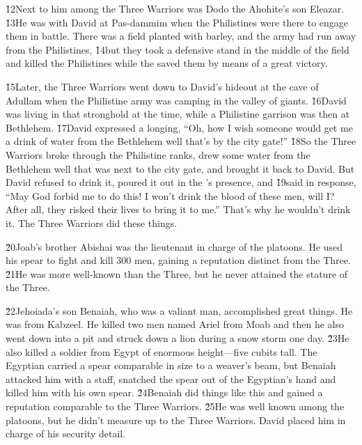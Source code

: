 \v{12}Next to him among the Three Warriors was Dodo the Ahohite's son Eleazar. \v{13}He was with David at Pas-dammim when the Philistines were there to engage them in battle. There was a field planted with barley, and the army had run away from the Philistines, \v{14}but they took a defensive stand in the middle of the field and killed the Philistines while the  saved them by means of a great victory.

\v{15}Later, the Three Warriors went down to David's hideout at the cave of Adullam when the Philistine army was camping in the valley of giants. \v{16}David was living in that stronghold at the time, while a Philistine garrison was then at Bethlehem. \v{17}David expressed a longing, ``Oh, how I wish someone would get me a drink of water from the Bethlehem well that's by the city gate!'' \v{18}So the Three Warriors broke through the Philistine ranks, drew some water from the Bethlehem well that was next to the city gate, and brought it back to David. But David refused to drink it, poured it out in the 's presence, and \v{19}said in response, ``May God forbid me to do this! I won't drink the blood of these men, will I? After all, they risked their lives to bring it to me.'' That's why he wouldn't drink it. The Three Warriors did these things.

\v{20}Joab's brother Abishai was the lieutenant in charge of the platoons. He used his spear to fight and kill 300 men, gaining a reputation distinct from the Three. \v{21}He was more well-known than the Three, but he never attained the stature of the Three.

\v{22}Jehoiada's son Benaiah, who was a valiant man, accomplished great things. He was from Kabzeel. He killed two men named Ariel from Moab and then he also went down into a pit and struck down a lion during a snow storm one day. \v{23}He also killed a soldier from Egypt of enormous height---five cubits tall. The Egyptian carried a spear comparable in size to a weaver's beam, but Benaiah attacked him with a staff, snatched the spear out of the Egyptian's hand and killed him with his own spear. \v{24}Benaiah did things like this and gained a reputation comparable to the Three Warriors. \v{25}He was well known among the platoons, but he didn't measure up to the Three Warriors. David placed him in charge of his security detail.

